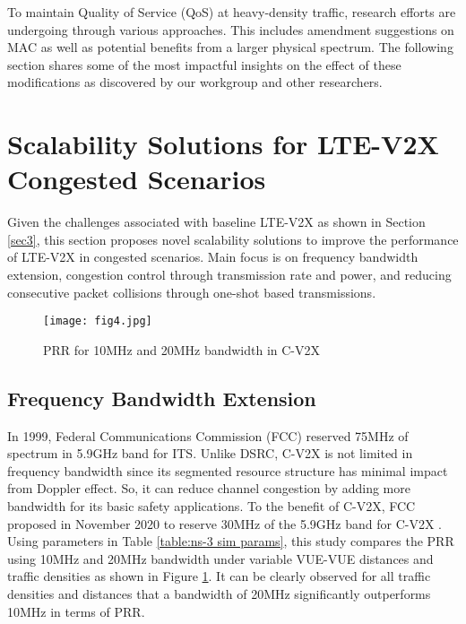 \documentclass[iicol]{sn-jnl}%
\theoremstyle{thmstyleone}%
\theoremstyle{thmstyletwo}%
\theoremstyle{thmstylethree}%
\begin{document}
To maintain Quality of Service (QoS) at heavy-density traffic, research efforts are undergoing through various approaches. This includes amendment suggestions on MAC as well as potential benefits from a larger physical spectrum. The following section shares some of the most impactful insights on the effect of these modifications as discovered by our workgroup and other researchers.


\section{Scalability Solutions for LTE-V2X Congested Scenarios}\label{sec5}
Given the challenges associated with baseline LTE-V2X as shown in Section \mbox{\ref{sec3}}, this section proposes novel scalability solutions to improve the performance of LTE-V2X in congested scenarios. Main focus is on frequency bandwidth extension, congestion control through transmission rate and power, and reducing consecutive packet collisions through one-shot based transmissions.



\begin{figure}[t]
\centerline{\texttt{[image: fig4.jpg]}}
\caption{PRR for 10MHz and 20MHz bandwidth in C-V2X}
\label{fig:PRR_10_20MHz}
\end{figure}

\subsection{Frequency Bandwidth Extension}\label{subsec5.1}
In 1999, Federal Communications Commission (FCC) reserved 75MHz of spectrum in 5.9GHz band for ITS. Unlike DSRC, C-V2X is not limited in frequency bandwidth since its segmented resource structure has minimal impact from Doppler effect. So, it can reduce channel congestion by adding more bandwidth for its basic safety applications. To the benefit of C-V2X, FCC proposed in November 2020 to reserve 30MHz of the 5.9GHz band for C-V2X \cite{useof5.850}. 
Using parameters in Table \mbox{\ref{table:ns-3 sim params}}, this study compares the PRR using 10MHz and 20MHz bandwidth under variable VUE-VUE distances and traffic densities as shown in Figure \mbox{\ref{fig:PRR_10_20MHz}}. It can be clearly observed for all traffic densities and distances that a bandwidth of 20MHz significantly outperforms 10MHz in terms of PRR.
\end{document}
